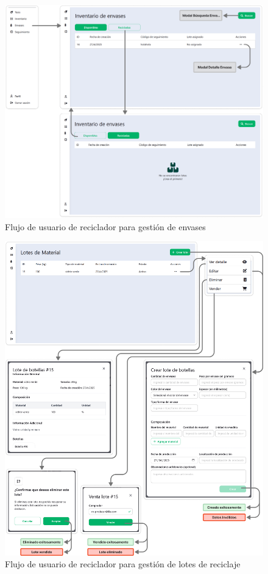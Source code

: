 \begin{figure}[!htb]
	\centering
	\includegraphics[width=\linewidth]{Figures/flow-recycler-bottles.png}
	\caption{Flujo de usuario de reciclador para gestión de envases}
  \label{fig:flow-recycler-bottles}
\end{figure}

\begin{figure}[!htb]
	\centering
	\includegraphics[width=\linewidth]{Figures/flow-recycler-inventory.png}
	\caption{Flujo de usuario de reciclador para gestión de lotes de reciclaje}
  \label{fig:flow-recycler-inventory}
\end{figure}

